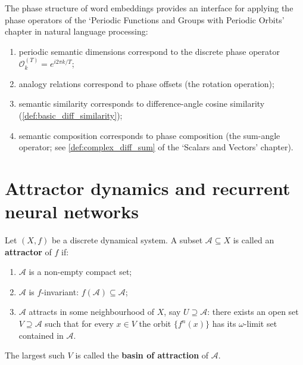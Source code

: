 \begin{remark}\label{rem:embedding_phase_operator_interface}
The phase structure of word embeddings provides an interface for applying the phase operators of the `Periodic Functions and Groups with Periodic Orbits' chapter in natural language processing:
\begin{enumerate}[label=(\roman*)]
    \item periodic semantic dimensions correspond to the discrete phase operator $\mathcal{O}_k^{(T)}=e^{i2\pi k/T}$;
    \item analogy relations correspond to phase offsets (the rotation operation);
    \item semantic similarity corresponds to difference-angle cosine similarity (\cref{def:basic_diff_similarity});
    \item semantic composition corresponds to phase composition (the sum-angle operator; see \cref{def:complex_diff_sum} of the `Scalars and Vectors' chapter).
\end{enumerate}
\end{remark}

\section{Attractor dynamics and recurrent neural networks}
\label{sec:attractor_dynamics}

\begin{definition}\label{def:attractor}
Let $(X,f)$ be a discrete dynamical system. A subset $\mathcal{A}\subseteq X$ is called an \textbf{attractor} of $f$ if:
\begin{enumerate}[label=(\roman*)]
    \item $\mathcal{A}$ is a non-empty compact set;
    \item $\mathcal{A}$ is $f$-invariant: $f(\mathcal{A})\subseteq\mathcal{A}$;
    \item $\mathcal{A}$ attracts in some neighbourhood of $X$, say $U\supseteq\mathcal{A}$: there exists an open set $V\supseteq\mathcal{A}$ such that for every $x\in V$ the orbit $\{f^n(x)\}$ has its $\omega$-limit set contained in $\mathcal{A}$.
\end{enumerate}
The largest such $V$ is called the \textbf{basin of attraction} of $\mathcal{A}$.
\end{definition}

